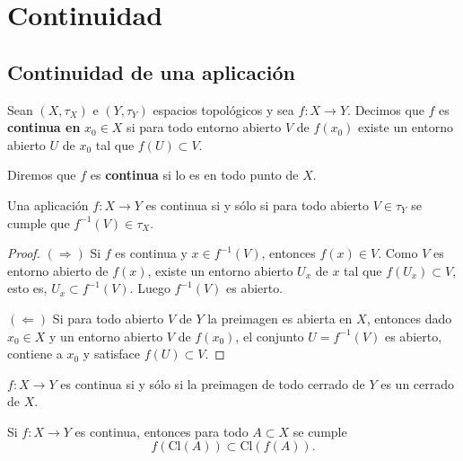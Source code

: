 ﻿\section{Continuidad}


\subsection{Continuidad de una aplicación}

\begin{definición}
    Sean $(X, \tau_X)$ e $(Y, \tau_Y)$ espacios topológicos y sea $f: X \to Y$. Decimos que $f$ es \textbf{continua en} $x_0 \in X$ si para todo entorno abierto $V$ de $f(x_0)$ existe un entorno abierto $U$ de $x_0$ tal que $f(U) \subset V$.

    Diremos que $f$ es \textbf{continua} si lo es en todo punto de $X$.
\end{definición}


\begin{teorema}
    Una aplicación $f: X \to Y$ es continua si y sólo si para todo abierto $V \in \tau_Y$ se cumple que $f^{-1}(V) \in \tau_X$.
\end{teorema}
\begin{proof}
    $(\Rightarrow)$ Si $f$ es continua y $x \in f^{-1}(V)$, entonces $f(x) \in V$. Como $V$ es entorno abierto de $f(x)$, existe un entorno abierto $U_x$ de $x$ tal que $f(U_x) \subset V$, esto es, $U_x \subset f^{-1}(V)$. Luego $f^{-1}(V)$ es abierto.

    $(\Leftarrow)$ Si para todo abierto $V$ de $Y$ la preimagen es abierta en $X$, entonces dado $x_0 \in X$ y un entorno abierto $V$ de $f(x_0)$, el conjunto $U=f^{-1}(V)$ es abierto, contiene a $x_0$ y satisface $f(U)\subset V$.
\end{proof}

\begin{proposición}
    $f: X \to Y$ es continua si y sólo si la preimagen de todo cerrado de $Y$ es un cerrado de $X$.
\end{proposición}

\begin{proposición}
    Si $f: X \to Y$ es continua, entonces para todo $A \subset X$ se cumple
    $$f(\mathrm{Cl}(A)) \subset \mathrm{Cl}(f(A)).$$
\end{proposición}

